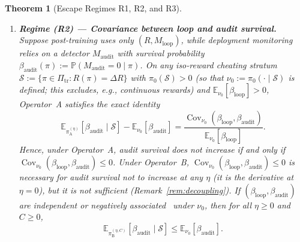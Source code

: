 \documentclass[11pt,a4paper]{article}
\newtheorem{theorem}{Theorem}
\newcommand{\E}{\mathbb{E}}
\newcommand{\Prob}{\mathbb{P}}
\newcommand{\Cov}{\operatorname{Cov}}
\begin{document}
\begin{theorem}[Escape Regimes R1, R2, and R3]
\begin{enumerate}
  \item \textbf{Regime (R2) --- Covariance between loop and audit survival.} Suppose post-training uses only $(R, M_{\mathrm{loop}})$, while deployment monitoring relies on a detector $M_{\mathrm{audit}}$ with survival probability $\beta_{\mathrm{audit}}(\pi) := \Prob(M_{\mathrm{audit}} = 0 \mid \pi)$. On any iso-reward cheating stratum $\mathcal{S} := \{\pi \in \Pi_{\mathrm{tr}} : R(\pi) = \Delta R\}$ with $\pi_0(\mathcal{S}) > 0$ (so that $\nu_0 := \pi_0(\cdot \mid \mathcal{S})$ is defined; this excludes, e.g., continuous rewards) and $\E_{\nu_0}[\beta_{\mathrm{loop}}] > 0$, Operator~A satisfies the exact identity
  \begin{equation}\label{eq:R2}
    \E_{\pi_{\mathrm{A}}^{(\eta)}}[\beta_{\mathrm{audit}} \mid \mathcal{S}] - \E_{\nu_0}[\beta_{\mathrm{audit}}]
    = \frac{\Cov_{\nu_0}(\beta_{\mathrm{loop}}, \beta_{\mathrm{audit}})}{\E_{\nu_0}[\beta_{\mathrm{loop}}]}.
  \end{equation}
  Hence, under Operator~A, audit survival does not increase if and only if $\Cov_{\nu_0}(\beta_{\mathrm{loop}}, \beta_{\mathrm{audit}}) \le 0$. Under Operator~B, $\Cov_{\nu_0}(\beta_{\mathrm{loop}}, \beta_{\mathrm{audit}}) \le 0$ is necessary for audit survival not to increase at any $\eta$ (it is the derivative at $\eta = 0$), but it is not sufficient (Remark~\ref{rem:decoupling}). If $(\beta_{\mathrm{loop}}, \beta_{\mathrm{audit}})$ are independent or negatively associated~\cite{joagdev1983} under $\nu_0$, then for all $\eta \ge 0$ and $C \ge 0$,
  \begin{equation}
    \E_{\pi_{\mathrm{B}}^{(\eta, C)}}[\beta_{\mathrm{audit}} \mid \mathcal{S}] \le \E_{\nu_0}[\beta_{\mathrm{audit}}].
  \end{equation}


\end{enumerate}
\end{theorem}
\end{document}

